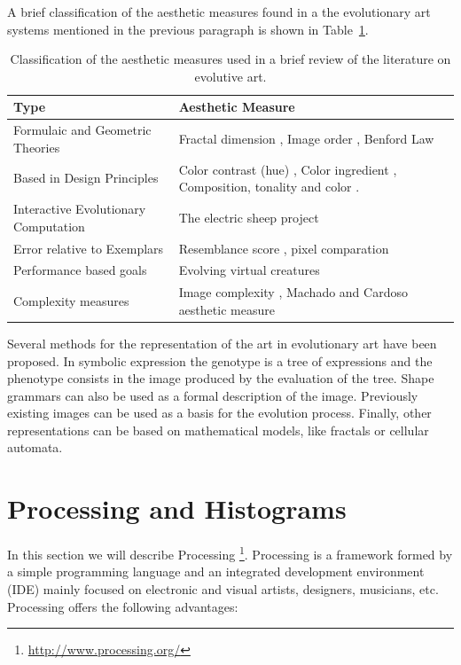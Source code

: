 \documentclass[conference]{IEEEtran}
\begin{document}
A brief classification of the aesthetic measures found in a the evolutionary art systems mentioned in the previous paragraph is shown in Table~\ref{table_class}.

\begin{table}[!t] 
\renewcommand{\arraystretch}{1.3} 
\caption{Classification of the aesthetic measures used in a brief review of the literature on evolutive art.} 
\label{table_class} 
\centering
\begin{tabular}{|l|l|}
\hline
Type & Aesthetic Measure \\ \hline
Formulaic and Geometric Theories & Fractal dimension \cite{den2010comparing}, Image order \cite{li2012investigating}, Benford Law \cite{del2005benford}\\ \hline
Based in Design Principles &  Color contrast (hue) \cite{den2012evolving},  Color ingredient \cite{li2012investigating}, Composition, tonality and color \cite{dipaola2009incorporating}.\\ \hline
Interactive Evolutionary Computation & The electric sheep project \cite{draves2006electric} \cite{ashlock2006evolutionary,moroni2000vox}\\ \hline
Error relative to Exemplars &  Resemblance score \cite{dipaola2009incorporating}, pixel comparation \cite{aguilar2008robotic}\\ \hline
Performance based goals & Evolving virtual creatures \cite{sims1994evolving} \\\hline
Complexity measures & Image complexity \cite{li2012investigating}, Machado and Cardoso aesthetic measure \cite{machado1998computing}\\ \hline
\end{tabular}
\end{table}

Several methods for the representation of the art in evolutionary art have been proposed. In symbolic expression the genotype is a tree of expressions and the phenotype consists in the image produced  by the evaluation of the tree. Shape grammars can also be used as a formal description of the image. Previously existing images can be used as a basis for the evolution process. Finally, other representations can be based on mathematical models, like fractals or cellular automata.




\section{Processing and Histograms}
\label{sec:processing}
In this section we will describe Processing \footnote{\url{http://www.processing.org/}}. Processing \cite{PROCESSING} is a framework formed by a simple programming language and an integrated development environment (IDE) mainly focused on electronic and visual artists, designers, musicians, etc. Processing offers the following advantages:
\end{document}
